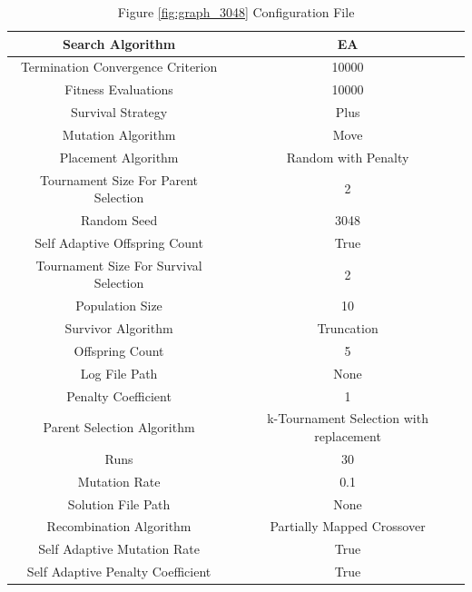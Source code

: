 \documentclass{standalone}
\begin{document}
\begin{table}[!htb]
	\centering
	\caption{Figure \ref{fig:graph_3048} Configuration File}
	\label{tab:graph_3048}
	\begin{tabular}{| c | c |}
		\hline
		Search Algorithm		& EA		 \\
		\hline
		Termination Convergence Criterion		& 10000		 \\
		\hline
		Fitness Evaluations		& 10000		 \\
		\hline
		Survival Strategy		& Plus		 \\
		\hline
		Mutation Algorithm		& Move		 \\
		\hline
		Placement Algorithm		& Random with Penalty		 \\
		\hline
		Tournament Size For Parent Selection		& 2		 \\
		\hline
		Random Seed		& 3048		 \\
		\hline
		Self Adaptive Offspring Count		& True		 \\
		\hline
		Tournament Size For Survival Selection		& 2		 \\
		\hline
		Population Size		& 10		 \\
		\hline
		Survivor Algorithm		& Truncation		 \\
		\hline
		Offspring Count		& 5		 \\
		\hline
		Log File Path		& None		 \\
		\hline
		Penalty Coefficient		& 1		 \\
		\hline
		Parent Selection Algorithm		& k-Tournament Selection with replacement		 \\
		\hline
		Runs		& 30		 \\
		\hline
		Mutation Rate		& 0.1		 \\
		\hline
		Solution File Path		& None		 \\
		\hline
		Recombination Algorithm		& Partially Mapped Crossover		 \\
		\hline
		Self Adaptive Mutation Rate		& True		 \\
		\hline
		Self Adaptive Penalty Coefficient		& True		 \\
		\hline
	\end{tabular}
\end{table}
\end{document}
